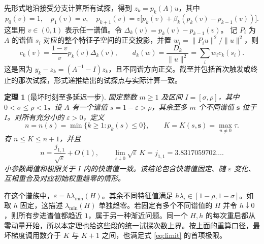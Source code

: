 \documentclass[11pt,a4paper,UTF8,fontset=fandol]{ctexart}
\newtheorem{theorem}{定理}[section]
\newcommand{\eps}{\varepsilon}
\newcommand{\norm}[1]{\lVert #1\rVert}
\begin{document}
先形式地沿接受分支计算所有试探，得到 \(z_k=p_k(A)u\)，其中
\begin{equation}
 p_0(v)=1,\quad p_1(v)=v,\quad
 p_{k+1}(v)=v\bigl[p_k(v)+\beta_k(p_k(v)-p_{k-1}(v))\bigr].
 \label{eq:recurrence}
\end{equation}
这里用 \(v\in(0,1)\) 表示任一谱值。令 \(\Delta_k(v)=p_k(v)-p_{k-1}(v)\)。
记 \(P_i\) 为 \(A\) 的谱值 \(s_i\) 对应的整个特征子空间的正交投影，并置 \(w_i=\norm{P_i u}^2/\norm{u}^2\)，则
\begin{equation}
 c_k(v)=\frac{1-v}{v}p_k(v)\Delta_k(v),
 \qquad
 d_k(w)=\frac{D_k}{\norm{u}^2}=\sum_i w_i c_k(s_i).
 \label{eq:criterion}
\end{equation}
这是因为 \(y_k-z_k=(A^{-1}-I)z_k\)，且不同谱方向正交。截至并包括首次触发或终止的那次试探，形式递推给出的试探点与实际计算一致。

\begin{theorem}[最坏时刻至多延迟一步]\label{thm:main}
固定整数 \(m\ge1\) 及区间 \(I=[\sigma,\rho]\)，其中 \(0<\sigma\le\rho<1\)。设 \(A\) 有一个谱值 \(s=1-\eps>\rho\)，其余至多 \(m\) 个不同谱值 \(\boldsymbol{s}\) 位于 \(I\)。对所有充分小的 \(\eps>0\)，定义
\[
 n=n(s)=\min\{k\ge1:p_k(s)\le0\},
 \qquad
 K=K(s,\boldsymbol{s})=\max_{u\ne0}\tau.
\]
有 \(n\le K\le n+1\)，并且
\begin{equation}
 n=\frac{j_{1,1}}{\sqrt{\eps}}+O(1),\qquad
 \lim_{\eps\downarrow0}\sqrt{\eps}\,K=j_{1,1}
       =3.8317059702\ldots .
 \label{eq:limit}
\end{equation}
小参数阈值和极限关于 \(I\) 内的快谱值一致。该结论包含快谱值固定、随 \(\eps\) 变化、互相重合及对应初始权重趋零的情形。
\end{theorem}

在这个谱族中，\(\eps=h\lambda_{\min}(H)\)。其余不同特征值满足 \(h\lambda_i\in[1-\rho,1-\sigma]\)。如取 \(h\) 固定，这描述 \(\lambda_{\min}(H)\) 单独趋零。若固定有多个不同谱值的 \(H\) 并令 \(h\downarrow0\)，则所有步进谱值都趋近 \(1\)，属于另一种渐近问题。同一个 \(H,h\) 的每次重启都从零动量开始，所以本定理也给这些段的统一试探次数上界。按上面的重算口径，最坏梯度调用数介于 \(K\) 与 \(K+1\) 之间，也满足式 \eqref{eq:limit} 的首项极限。
\end{document}
